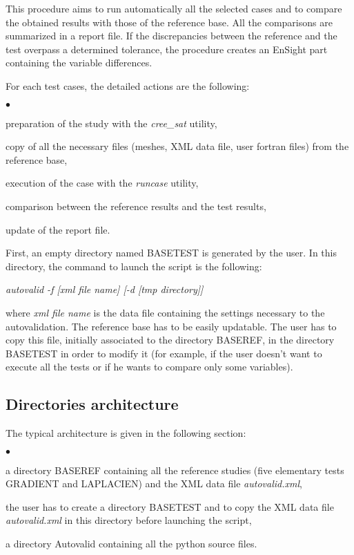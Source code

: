 This procedure aims to run automatically all the selected cases and to
compare the obtained results with those of the reference base. All the
comparisons are summarized in a report file.
If the discrepancies between the reference and the test overpass a
determined tolerance, the procedure creates an EnSight part containing
the variable differences.

For each test cases, the detailed actions are the following:
\begin{list}{$\bullet$}{}
\item preparation of the study with the {\it cree\_sat} utility,
\item copy of all the necessary files (meshes, XML data file, user
      fortran files) from the reference base,
\item execution of the case with the {\it runcase} utility,
\item comparison between the reference results and the test results,
\item update of the report file.
\end{list}

First, an empty directory named BASETEST is generated by the user.
In this directory, the command to launch the script is the following:
\begin{center}
{\it autovalid -f [xml file name] [-d [tmp directory]] }
\end{center}
where {\it xml file name} is the data file containing the settings
necessary to the autovalidation. The reference base has to be easily
updatable. The user has to copy this file, initially associated to the
directory BASEREF, in the directory BASETEST in order to modify it (for
example, if the user doesn't want to execute all the tests or if he
wants to compare only some variables).


\subsection{Directories architecture}

The typical architecture is given in the following section:

\begin{list}{$\bullet$}{}
\item a directory BASEREF containing all the reference studies
      (five elementary tests GRADIENT and LAPLACIEN) and the XML data
      file {\it autovalid.xml},
\item the user has to create a directory BASETEST and to copy
      the XML data file {\it autovalid.xml} in this directory before
      launching the script,
\item a directory Autovalid containing all the python source files.
\end{list}



